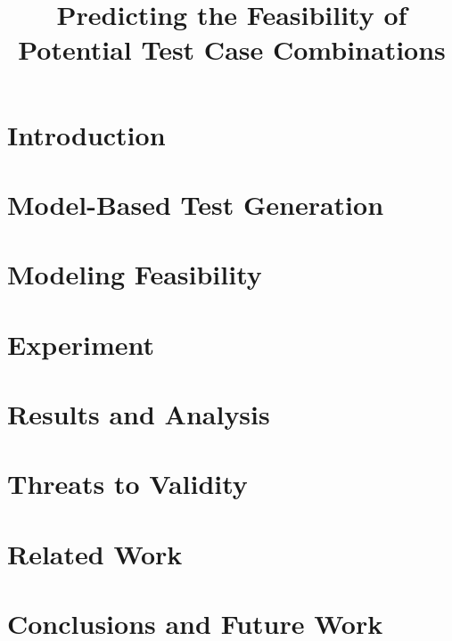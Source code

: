 \documentclass[conference]{IEEEtran}
\begin{document}
\title{Predicting the Feasibility of Potential Test Case Combinations}



\maketitle

\begin{abstract}

\end{abstract}

\section{Introduction}


\section{Model-Based Test Generation}


\section{Modeling Feasibility}


\section{Experiment}


\section{Results and Analysis}


\section{Threats to Validity}


\section{Related Work}


\section{Conclusions and Future Work}



\end{document}
